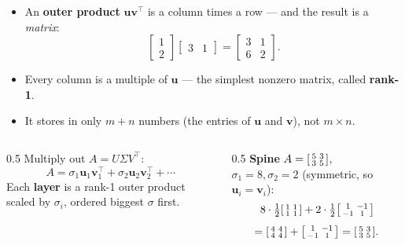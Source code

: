 \documentclass[aspectratio=169, 11pt]{beamer}
\newcommand{\uu}{\mathbf{u}}
\newcommand{\vv}{\mathbf{v}}
\newcommand{\T}{^{\top}}
\begin{document}
\begin{frame}[t, plain]
  \begin{itemize}
    \setlength{\itemsep}{6pt}
    \item An \textbf{outer product} $\uu\vv\T$ is a column times a row --- and the result is a \emph{matrix}:
          \[ \begin{bmatrix} 1\\2 \end{bmatrix}\begin{bmatrix} 3 & 1 \end{bmatrix}
             =\begin{bmatrix} 3 & 1\\ 6 & 2 \end{bmatrix}. \]
    \item Every column is a multiple of $\uu$ --- the simplest nonzero matrix, called \textbf{rank-1}.
    \item It stores in only $m+n$ numbers (the entries of $\uu$ and $\vv$), not $m\times n$.
  \end{itemize}
\end{frame}

\begin{frame}[t, plain]
  \begin{columns}[T]
    \begin{column}{0.5\textwidth}
      Multiply out $A=U\Sigma V\T$:
      \[ A=\sigma_1\uu_1\vv_1\T+\sigma_2\uu_2\vv_2\T+\cdots \]
      Each \textbf{layer} is a rank-1 outer product scaled by $\sigma_i$, ordered biggest $\sigma$ first.
    \end{column}
    \begin{column}{0.5\textwidth}
      \textbf{Spine} $A=\begin{bsmallmatrix} 5 & 3\\ 3 & 5 \end{bsmallmatrix}$, $\sigma_1=8,\sigma_2=2$
      (symmetric, so $\uu_i=\vv_i$):
      \[ 8\cdot\tfrac12\begin{bsmallmatrix} 1 & 1\\ 1 & 1 \end{bsmallmatrix}
         +2\cdot\tfrac12\begin{bsmallmatrix} 1 & -1\\ -1 & 1 \end{bsmallmatrix} \]
      \[ =\begin{bsmallmatrix} 4 & 4\\ 4 & 4 \end{bsmallmatrix}
         +\begin{bsmallmatrix} 1 & -1\\ -1 & 1 \end{bsmallmatrix}
         =\begin{bsmallmatrix} 5 & 3\\ 3 & 5 \end{bsmallmatrix}. \]
    \end{column}
  \end{columns}
\end{frame}
\end{document}
